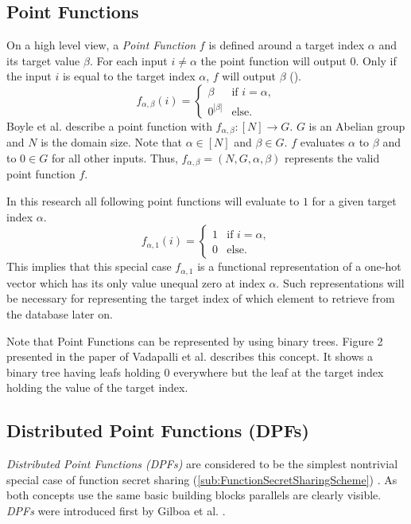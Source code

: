 \subsection{Point Functions}
\label{sub:PointFunctions}
On a high level view, a \textit{Point Function} $f$ is defined around a target index $\alpha$ and its target value $\beta$.
For each input $i\neq\alpha$ the point function will output $0$.
Only if the input $i$ is equal to the target index $\alpha$, $f$ will output $\beta$ (\cite{gilboa2014distributed}).
\[
f_{\alpha,\beta}(i) = \begin{cases} 
      \beta & \text{if } i = \alpha, \\
      0^{|\beta|} & \text{else}.
   \end{cases}
\]
Boyle et al. \cite{boyle2023information} describe a point function with $f_{\alpha, \beta}:[N]\rightarrow G$. 
$G$ is an Abelian group and $N$ is the domain size.
Note that $\alpha\in[N]$ and $\beta\in G$.
$f$ evaluates $\alpha$ to $\beta$ and to $0\in G$ for all other inputs.
Thus, $f_{\alpha,\beta}=(N,G,\alpha,\beta)$ represents the valid point function $f$.

In this research all following point functions will evaluate to $1$ for a given target index $\alpha$.
\[
f_{\alpha,1}(i) = \begin{cases} 
      1 & \text{if } i = \alpha, \\
      0 & \text{else}.
   \end{cases}
\]
This implies that this special case $f_{\alpha,1}$ is a functional representation of a one-hot vector which has its only value unequal zero at index $\alpha$.
Such representations will be necessary for representing the target index of which element to retrieve from the database later on.

Note that Point Functions can be represented by using binary trees.
Figure 2 presented in the paper of Vadapalli et al. \cite{vadapalli2023duoram} describes this concept.
It shows a binary tree having leafs holding $0$ everywhere but the leaf at the target index holding the value of the target index.

\subsection{Distributed Point Functions (DPFs)}
\label{sub:DistributedPointFunctions}
\textit{Distributed Point Functions (DPFs)} are considered to be the simplest nontrivial special case of function secret sharing (\ref{sub:FunctionSecretSharingScheme}) \cite{boyle2016function}.
As both concepts use the same basic building blocks parallels are clearly visible.
\textit{DPFs} were introduced first by Gilboa et al. \cite{gilboa2014distributed}.

